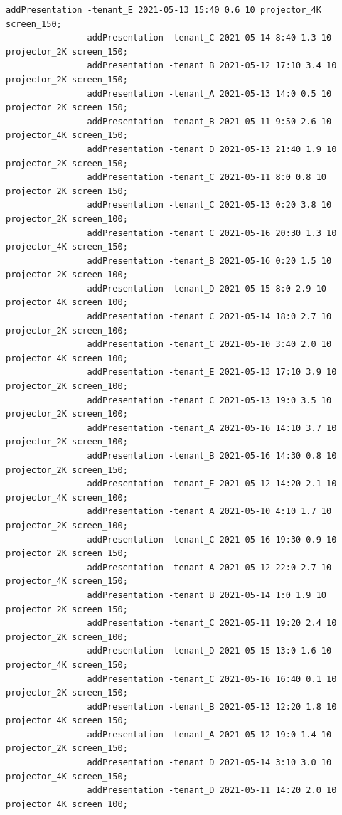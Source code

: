 \documentclass{article}
\begin{document}
\begin{Verbatim}[gobble=8]
                addPresentation -tenant_E 2021-05-13 15:40 0.6 10 projector_4K screen_150;
                addPresentation -tenant_C 2021-05-14 8:40 1.3 10 projector_2K screen_150;
                addPresentation -tenant_B 2021-05-12 17:10 3.4 10 projector_2K screen_150;
                addPresentation -tenant_A 2021-05-13 14:0 0.5 10 projector_2K screen_150;
                addPresentation -tenant_B 2021-05-11 9:50 2.6 10 projector_4K screen_150;
                addPresentation -tenant_D 2021-05-13 21:40 1.9 10 projector_2K screen_150;
                addPresentation -tenant_C 2021-05-11 8:0 0.8 10 projector_2K screen_150;
                addPresentation -tenant_C 2021-05-13 0:20 3.8 10 projector_2K screen_100;
                addPresentation -tenant_C 2021-05-16 20:30 1.3 10 projector_4K screen_150;
                addPresentation -tenant_B 2021-05-16 0:20 1.5 10 projector_2K screen_100;
                addPresentation -tenant_D 2021-05-15 8:0 2.9 10 projector_4K screen_100;
                addPresentation -tenant_C 2021-05-14 18:0 2.7 10 projector_2K screen_100;
                addPresentation -tenant_C 2021-05-10 3:40 2.0 10 projector_4K screen_100;
                addPresentation -tenant_E 2021-05-13 17:10 3.9 10 projector_2K screen_100;
                addPresentation -tenant_C 2021-05-13 19:0 3.5 10 projector_2K screen_100;
                addPresentation -tenant_A 2021-05-16 14:10 3.7 10 projector_2K screen_100;
                addPresentation -tenant_B 2021-05-16 14:30 0.8 10 projector_2K screen_150;
                addPresentation -tenant_E 2021-05-12 14:20 2.1 10 projector_4K screen_100;
                addPresentation -tenant_A 2021-05-10 4:10 1.7 10 projector_2K screen_100;
                addPresentation -tenant_C 2021-05-16 19:30 0.9 10 projector_2K screen_150;
                addPresentation -tenant_A 2021-05-12 22:0 2.7 10 projector_4K screen_150;
                addPresentation -tenant_B 2021-05-14 1:0 1.9 10 projector_2K screen_150;
                addPresentation -tenant_C 2021-05-11 19:20 2.4 10 projector_2K screen_100;
                addPresentation -tenant_D 2021-05-15 13:0 1.6 10 projector_4K screen_150;
                addPresentation -tenant_C 2021-05-16 16:40 0.1 10 projector_2K screen_150;
                addPresentation -tenant_B 2021-05-13 12:20 1.8 10 projector_4K screen_150;
                addPresentation -tenant_A 2021-05-12 19:0 1.4 10 projector_2K screen_150;
                addPresentation -tenant_D 2021-05-14 3:10 3.0 10 projector_4K screen_150;
                addPresentation -tenant_D 2021-05-11 14:20 2.0 10 projector_4K screen_100;

\end{Verbatim}
\end{document}
